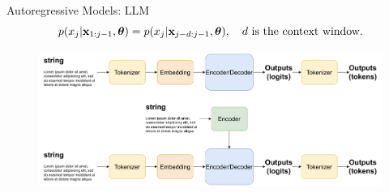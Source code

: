 \documentclass{beamer}
\begin{document}
\begin{frame}{Autoregressive Models: LLM}
	\[
		p(x_j | \mathbf{x}_{1:j - 1}, \boldsymbol{\theta}) = p(x_j | \mathbf{x}_{j - d:j - 1}, \boldsymbol{\theta}),\quad d\ \text{is the context window}.
	\]
	 \begin{figure}
		   \centering
		   \includegraphics[width=1.0\linewidth]{figs/llm_modeling}
	 \end{figure}
\end{frame}
\end{document}
